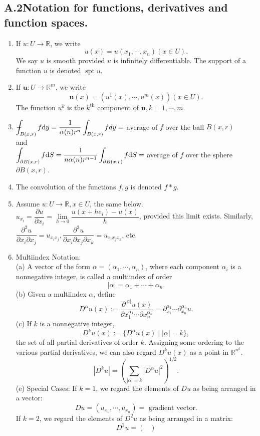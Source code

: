 \documentclass[hyperref,UTF8,12pt]{article}
\numberwithin{equation}{subsection}
\theoremstyle{plain}
\theoremstyle{definition}
\numberwithin{theorem}{section}
\numberwithin{lemma}{section}
\numberwithin{proposition}{section}
\numberwithin{remark}{section}
\numberwithin{corollary}{section}
\numberwithin{definition}{section}
\numberwithin{problem}{section}
\numberwithin{example}{section}
\def\dif{\textup{d}}
\def\Xint#1{\mathchoice
	{\XXint\displaystyle\textstyle{#1}}%
	{\XXint\textstyle\scriptstyle{#1}}%
	{\XXint\scriptstyle\scriptscriptstyle{#1}}%
	{\XXint\scriptscriptstyle\scriptscriptstyle{#1}}%
	\!\int}
\def\XXint#1#2#3{{\setbox0=\hbox{$#1{#2#3}{\int}$ }
		\vcenter{\hbox{$#2#3$ }}\kern-.55\wd0}}
\def\dashint{\Xint-}
\newcommand{\dis}{\displaystyle}
\newcommand{\limls}{\lim\limits}
\newcommand{\ptl}{\partial}
\newcommand{\mr}{\mathbb{R}}
\newcommand{\spt}{\operatorname{spt}}
\begin{document}
\begin{appendices}
\subsection*{A.2\quad Notation for functions, derivatives and function spaces.}
\begin{enumerate}
\item If $u:U\to\mr$, we write\[u(x)=u(x_1,\cdots,x_n)(x\in U).\]
We say $u$ is smooth provided $u$ is infinitely differentiable. The support of a function $u$ is denoted $\spt u$.
\item If $\mathbf{u}:U\to\mr^m$, we write\[\mathbf{u}(x)=(u^1(x),\cdots,u^m(x))(x\in U).\]The function $u^k$ is the $k^{\text{th}}$ component of $\mathbf{u},k=1,\cdots,m$.
\item $\dis\dashint_{B(x, r)}f\dif y=\frac{1}{\alpha(n) r^n} \int_{B(x, r)} f d y=$ average of $f$ over the ball $B(x,r)$ \\[6pt] and\\[6pt]
$\dis\dashint_{\ptl B(x,r)}f\dif S=\frac{1}{n\alpha(n)r^{n-1}}\int_{\ptl B(x,r)}f\dif S=$ average of $f$ over the sphere $\ptl B(x,r)$.
\item The convolution of the functions $f, g$ is denoted $f*g$.
\item Assume $u:U\to\mr,x\in U$, the same below. $u_{x_i}=\dfrac{\ptl u}{\ptl x_i}=\limls_{h\to0}\dfrac{u(x+he_i)-u(x)}{h}$, provided this limit exists. Similarly, $\dfrac{\ptl^2u}{\ptl x_i\ptl x_j}=u_{x_ix_j}, \dfrac{\ptl^3u}{\ptl x_i\ptl x_j\ptl x_k}=u_{x_ix_jx_k}$, etc.
\item Multiindex Notation:\\
(a) A vector of the form $\alpha=(\alpha_1,\cdots,\alpha_n)$, where each component $\alpha_i$ is a nonnegative integer, is called a multiindex of order
\[|\alpha|=\alpha_1+\cdots+\alpha_n.\]
(b) Given a multiindex $\alpha$, define
\[D^\alpha u(x):=\frac{\ptl^{|\alpha|} u(x)}{\ptl x_1^{\alpha_1}\cdots\ptl x_n^{\alpha_n}}=\ptl_{x_1}^{\alpha_1}\cdots\ptl_{x_n}^{\alpha_n}u.\]
(c) If $k$ is a nonnegative integer,\[D^ku(x):=\{D^\alpha u(x)\mid|\alpha|=k\},\]
the set of all partial derivatives of order $k$. Assigning some ordering to the various partial derivatives, we can also regard $D^ku(x)$ as a point in $\mr^{n^k}$.
\[|D^k u|=\left(\sum_{|\alpha|=k}|D^\alpha u|^2\right)^{1/2}.\tag{d}\]
(e) Special Cases: If $k=1$, we regard the elements of $Du$ as being arranged in a vector:
\[Du=(u_{x_1},\cdots,u_{x_n})=\text{~gradient vector}.\]
If $k=2$, we regard the elements of $D^2 u$ as being arranged in a matrix:
\[D^2u=\begin{pmatrix}

\end{pmatrix}\]
\end{enumerate}
\end{appendices}
\end{document}
